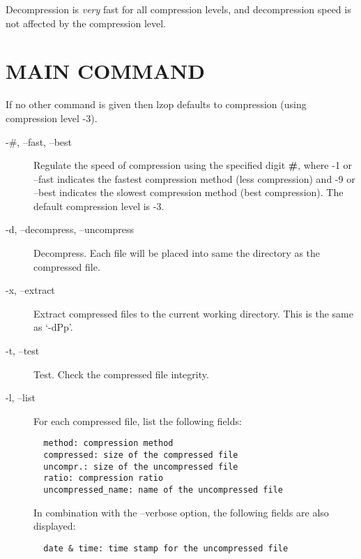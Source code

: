 Decompression is \textit{very} fast for all compression levels,
and decompression speed is not affected by the compression
level.

\section{MAIN COMMAND\label{MAIN_COMMAND}}


If no other command is given then lzop defaults to compression
(using compression level -3).

\begin{description}

\item[-\#, --fast, --best] \mbox{}

Regulate the speed of compression using the specified
digit \textbf{\#}, where -1 or --fast indicates the
fastest compression method (less compression) and
-9 or --best indicates the slowest compression
method (best compression). The default compression
level is -3.


\item[-d, --decompress, --uncompress] \mbox{}

Decompress. Each file will be placed into
same the directory as the compressed file.


\item[-x, --extract] \mbox{}

Extract compressed files to the current working
directory. This is the same as `-dPp'.


\item[-t, --test] \mbox{}

Test. Check the compressed file integrity.


\item[-l, --list] \mbox{}

For each compressed file, list the following
fields:

\begin{verbatim}
  method: compression method
  compressed: size of the compressed file
  uncompr.: size of the uncompressed file
  ratio: compression ratio
  uncompressed_name: name of the uncompressed file
\end{verbatim}


In combination with the --verbose option, the following
fields are also displayed:

\begin{verbatim}
  date & time: time stamp for the uncompressed file
\end{verbatim}



\end{description}
